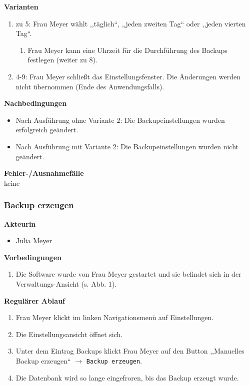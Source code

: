 \documentclass[fontsize=12pt,paper=a4,twoside]{scrartcl}
\begin{document}
\textbf{Varianten}
\begin{enumerate}
\item zu 5: Frau Meyer wählt ,,täglich``, ,,jeden zweiten Tag`` oder ,,jeden vierten Tag``.
	\begin{enumerate}[label=\arabic*.]
	\item Frau Meyer kann eine Uhrzeit für die Durchführung des Backups festlegen (weiter zu 8).
	\end{enumerate}
\item 4-9: Frau Meyer schließt das Einstellungsfenster. Die Änderungen werden nicht übernommen (Ende des Anwendungsfalls).
\end{enumerate}
\vspace{5pt}

\textbf{Nachbedingungen}
\begin{itemize}
\item Nach Ausführung ohne Variante 2: Die Backupeinstellungen wurden erfolgreich geändert.
\item Nach Ausführung mit Variante 2: Die Backupeinstellungen wurden nicht geändert.
\end{itemize}
\vspace{5pt}

\textbf{Fehler-/Ausnahmefälle}\\
keine

\subsubsection{Backup erzeugen}
\textbf{Akteurin}
\begin{itemize}
\item Julia Meyer
\end{itemize}
\vspace{5pt}

\textbf{Vorbedingungen}
\begin{enumerate}
\item Die Software wurde von Frau Meyer gestartet und sie befindet sich in der Verwaltungs-Ansicht (s. Abb. 1).
\end{enumerate}
\vspace{5pt}

\textbf{Regulärer Ablauf}
\begin{enumerate}
\item Frau Meyer klickt im linken Navigationsmenü auf Einstellungen.
\item Die Einstellungsansicht öffnet sich. 
\item Unter dem Eintrag Backups klickt Frau Meyer auf den Button ,,Manuelles Backup erzeugen`` $\rightarrow$ \texttt{Backup erzeugen}.
\item Die Datenbank wird so lange eingefroren, bis das Backup erzeugt wurde.
\end{enumerate}
\vspace{5pt}
\end{document}
